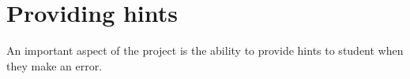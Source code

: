 \section{Providing hints}

An important aspect of the project is the ability to provide hints to student when they make an error.